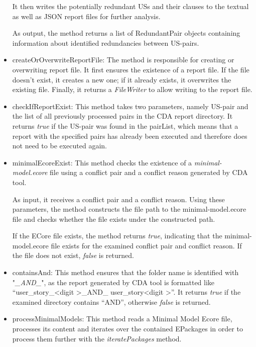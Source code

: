 \begin{itemize}
	It then writes the potentially redundant USs and their clauses to the textual as well as JSON report files for further analysis.
	
	As output, the method returns a list of RedundantPair objects containing information about identified redundancies between US-pairs.
	
	\item createOrOverwriteReportFile: The method is responsible for creating or overwriting report file. It first ensures the existence of a report file. If the file doesn't exist, it creates a new one; if it already exists, it overwrites the existing file. Finally, it returns a \textit{FileWriter} to allow writing to the report file.
	
	\item checkIfReportExist: This method takes two parameters, namely US-pair and the list of all previously processed pairs in the CDA report directory. It returns \textit{true} if the US-pair was found in the pairList, which means that a report with the specified pairs has already been executed and therefore does not need to be executed again.
	
	\item minimalEcoreExist: This method checks the existence of a \textit{minimal-model.ecore} file using a conflict pair and a conflict reason generated by CDA tool.
	
	As input, it receives a conflict pair and a conflict reason. Using these parameters, the method constructs the file path to the minimal-model.ecore file and checks whether the file exists under the constructed path.
	
	If the ECore file exists, the method returns \textit{true}, indicating that the minimal-model.ecore file exists for the examined conflict pair and conflict reason. If the file does not exist, \textit{false} is returned.
	
	\item containsAnd: This method ensures that the folder name is identified with "\textit{\_AND\_}", as the report generated by CDA tool is formatted like \enquote{user\_story\_\textless digit \textgreater \_AND\_ user\_story\textless digit \textgreater}. It returns \textit{true} if the examined directory contains \enquote{AND}, otherwise \textit{false} is returned.
	
	\item processMinimalModels: This method reads a Minimal Model Ecore file, processes its content and iterates over the contained EPackages in order to process them further with the \textit{iteratePackages} method. 
	

\end{itemize}
